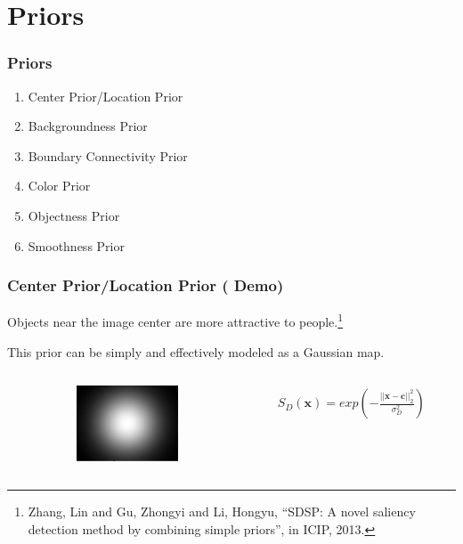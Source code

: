 \documentclass[notheorems,serif,table,compress]{beamer}  %
\begin{document}
\section{Priors}

\begin{frame}
\frametitle{Priors}
\begin{enumerate}
\item Center Prior/Location Prior
\item Backgroundness Prior
\item Boundary Connectivity Prior
\item Color Prior
\item Objectness Prior
\item Smoothness Prior
\end{enumerate}
\end{frame}


\begin{frame}
\frametitle{{\color{magenta}} Center Prior/Location Prior (\color{yellow} \textbf{Demo})}
{\color{blue}Objects near the image center are more attractive to people.}\footnote{Zhang, Lin and Gu, Zhongyi and Li, Hongyu, ``SDSP: A novel saliency detection method by combining simple priors'', in ICIP, 2013.}

\vspace{0.15in}

This prior can be simply and effectively modeled as a Gaussian map.

\vspace{0.15in}

\begin{columns}
\begin{column}{\leftmargini}
\end{column}
\hspace{-1in}
\begin{column}{0.1\linewidth}
\centering\includegraphics[width=3cm]{CenterPrior}
\end{column}
\begin{column}{0.7\linewidth}
\begin{align}
S_D(\textbf{x}) = exp\left(-\frac{||\textbf{x}-\textbf{c}||_2^2}{\sigma_D^2}\right)
\end{align}
\end{column}
\end{columns}\vspace{1ex}
\vspace{-0.4in}
\end{frame}
\end{document}
